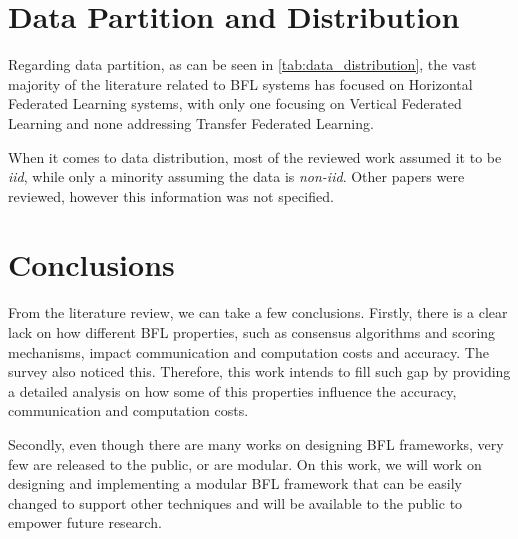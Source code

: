 \section{Data Partition and Distribution}

Regarding data partition, as can be seen in \autoref{tab:data_distribution}, the vast majority of the literature related to BFL systems has focused on Horizontal Federated Learning systems, with only one focusing on Vertical Federated Learning and none addressing Transfer Federated Learning.

When it comes to data distribution, most of the reviewed work assumed it to be \textit{iid}, while only a minority assuming the data is \textit{non-iid}. Other papers were reviewed, however this information was not specified.



\section{Conclusions}

From the literature review, we can take a few conclusions. Firstly, there is a clear lack on how different BFL properties, such as consensus algorithms and scoring mechanisms, impact communication and computation costs and accuracy. The survey \cite{9403374} also noticed this. Therefore, this work intends to fill such gap by providing a detailed analysis on how some of this properties influence the accuracy, communication and computation costs.

Secondly, even though there are many works on designing BFL frameworks, very few are released to the public, or are modular. On this work, we will work on designing and implementing a modular BFL framework that can be easily changed to support other techniques and will be available to the public to empower future research.  
